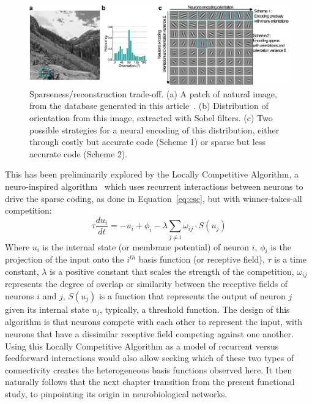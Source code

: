 \begin{figure}[h!tbp]
\vspace{0.1cm}
\centering
\includegraphics[width=1.\textwidth]{fig/chap3_tradeoff.pdf}
\caption[Sparseness/reconstruction trade-off.]{Sparseness/reconstruction trade-off. (a) A patch of natural image, from the database generated in this article~\cite{ladret2023imgs}. (b) Distribution of orientation from this image, extracted with Sobel filters. (c) Two possible strategies for a neural encoding of this distribution, either through costly but accurate code (Scheme 1) or sparse but less accurate code (Scheme 2).}
\label{fig_chap3_tradeoff}
\end{figure}

This has been preliminarily explored by the Locally Competitive Algorithm, a neuro-inspired algorithm~\cite{rozell2008sparse} which uses recurrent interactions between neurons to drive the sparse coding, as done in Equation~\ref{eq:csc}, but with winner-takes-all competition:
\begin{equation}
    \tau \frac{du_i}{dt} = -u_i + \phi_i - \lambda \sum_{j \neq i} \omega_{ij} \cdot S(u_j) 
\end{equation}
Where \( u_i \) is the internal state (or membrane potential) of neuron \( i \), \( \phi_i \) is the projection of the input onto the \( i^{th} \) basis function (or receptive field), \( \tau \) is a time constant, \( \lambda \) is a positive constant that scales the strength of the competition, \( \omega_{ij} \) represents the degree of overlap or similarity between the receptive fields of neurons \( i \) and \( j \), \( S(u_j) \) is a function that represents the output of neuron \( j \) given its internal state \( u_j \), typically, a threshold function. The design of this algorithm is that neurons compete with each other to represent the input, with neurons that have a dissimilar receptive field competing against one another. Using this Locally Competitive Algorithm as a model of recurrent versus feedforward interactions would also allow seeking which of these two types of connectivity creates the heterogeneous basis functions observed here. It then naturally follows that the next chapter transition from the present functional study, to pinpointing its origin in neurobiological networks.
